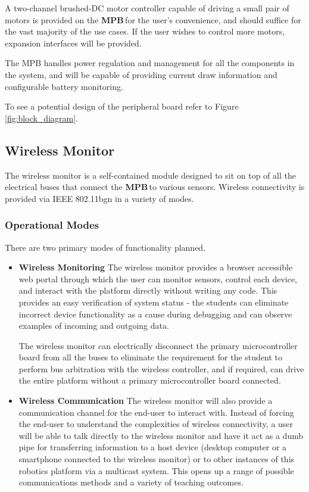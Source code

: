 \documentclass[letterpaper]{article}
\newcommand{\MPB}{\textbf{MPB}\,}
\begin{document}
A two-channel brushed-DC motor controller capable of driving a small pair of motors is provided on the \MPB for the user's convenience, and should suffice for the vast majority of the use cases. If the user wishes to control more motors, expansion interfaces will be provided.

The MPB handles power regulation and management for all the components in the system, and will be capable of providing current draw information and configurable battery monitoring.

To see a potential design of the peripheral board refer to Figure \ref{fig:block_diagram}.


\subsection{Wireless Monitor}
The wireless monitor is a self-contained module designed to sit on top of all the electrical buses that connect the \MPB to various sensors. Wireless connectivity is provided via IEEE 802.11b\/g\/n in a variety of modes.

\label{ss:operational-modes}
\subsubsection{Operational Modes}
There are two primary modes of functionality planned.

\begin{itemize}
\item{\textbf{Wireless Monitoring}}
The wireless monitor provides a browser accessible web portal through which the user can monitor sensors, control  each device, and interact with the platform directly without writing any code. This provides an easy verification of system status - the students can eliminate incorrect device functionality as a cause during debugging and can observe examples of incoming and outgoing data. 

The wireless monitor can electrically disconnect the primary microcontroller board from all the buses to eliminate the requirement for the student to perform bus arbitration with the wireless controller, and if required, can drive the entire platform without a primary microcontroller board connected.


\item {\textbf{Wireless Communication}}
The wireless monitor will also provide a communication channel for the end-user to interact with. Instead of forcing the end-user to understand the complexities of wireless connectivity, a user will be able to talk directly to the wireless monitor and have it act as a dumb pipe for transferring information to a host device (desktop computer or a smartphone connected to the wireless monitor) or to other instances of this robotics platform via a multicast system.  This opens up a range of possible communications methods and a variety of teaching outcomes.
\end{itemize}
\end{document}
